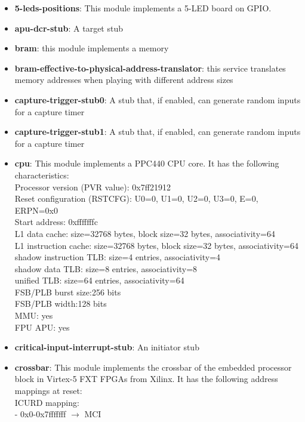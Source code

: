 \begin{itemize}\addtolength{\itemsep}{-0.40\baselineskip}
\item \textbf{5-leds-positions}: This module implements a 5-LED board on GPIO.\\

\item \textbf{apu-dcr-stub}: A target stub
\item \textbf{bram}: this module implements a memory
\item \textbf{bram-effective-to-physical-address-translator}: this service translates memory addresses when playing with different address sizes
\item \textbf{capture-trigger-stub0}: A stub that, if enabled, can generate random inputs for a capture timer
\item \textbf{capture-trigger-stub1}: A stub that, if enabled, can generate random inputs for a capture timer
\item \textbf{cpu}: This module implements a PPC440 CPU core. It has the following characteristics:\\
Processor version (PVR value): 0x7ff21912\\
Reset configuration (RSTCFG): U0=0, U1=0, U2=0, U3=0, E=0, ERPN=0x0\\
Start address: 0xfffffffc\\
L1 data cache: size=32768 bytes, block size=32 bytes, associativity=64\\
L1 instruction cache: size=32768 bytes, block size=32 bytes, associativity=64\\
shadow instruction TLB: size=4 entries, associativity=4\\
shadow data TLB: size=8 entries, associativity=8\\
unified TLB: size=64 entries, associativity=64\\
FSB/PLB burst size:256 bits\\
FSB/PLB width:128 bits\\
MMU: yes\\
FPU APU: yes
\item \textbf{critical-input-interrupt-stub}: An initiator stub
\item \textbf{crossbar}: This module implements the crossbar of the embedded processor block in Virtex-5 FXT FPGAs from Xilinx. It has the following address mappings at reset:\\
ICURD mapping:\\
  - 0x0-0x7fffffff $\rightarrow$ MCI\\

\end{itemize}
